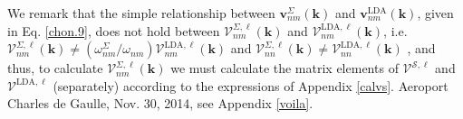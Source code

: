 We remark that the simple relationship between 
$\mathbf{v}^{\Sigma}_{nm}(\mathbf{k})$ 
and 
$\mathbf{v}^{\mathrm{LDA}}_{nm}(\mathbf{k})$,
given in 
Eq. \eqref{chon.9}, 
does not hold between
$\boldsymbol{\mathcal{V}}^{\Sigma,\ell}_{nm}(\mathbf{k})$   
and 
$\boldsymbol{\mathcal{V}}^{\mathrm{LDA},\ell}_{nm}(\mathbf{k})$,
i.e.
$\boldsymbol{\mathcal{V}}^{\Sigma,\ell}_{nm}(\mathbf{k})\ne
(\omega^\Sigma_{nm}/\omega_{nm})
\boldsymbol{\mathcal{V}}^{\mathrm{LDA},\ell}_{nm}(\mathbf{k})$ 
and
$\boldsymbol{\mathcal{V}}^{\Sigma,\ell}_{nn}(\mathbf{k})\ne
\boldsymbol{\mathcal{V}}^{\mathrm{LDA},\ell}_{nn}(\mathbf{k})$
,
and thus, to calculate
$\boldsymbol{\mathcal{V}}^{\Sigma,\ell}_{nm}(\mathbf{k})$ 
we must calculate the matrix elements of $\boldsymbol{\mathcal{V}}^{\mathcal{S},\ell}$ and
$\boldsymbol{\mathcal{V}}^{\mathrm{LDA},\ell}$ (separately)
according to the expressions of
Appendix \ref{calvs}. {\color{red}Aeroport Charles de Gaulle, Nov. 30,
2014, see Appendix \ref{voila}}.

